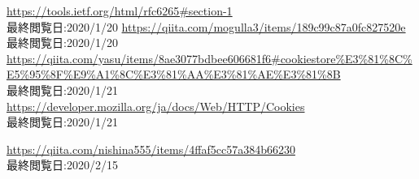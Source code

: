 \begin{thebibliography}{99}
 \url{https://tools.ietf.org/html/rfc6265#section-1} \\ 最終閲覧日:2020/1/20
 \url{https://qiita.com/mogulla3/items/189c99c87a0fc827520e} \\ 最終閲覧日:2020/1/20
 \url{https://qiita.com/yasu/items/8ae3077bdbee606681f6#cookiestore%E3%81%8C%E5%95%8F%E9%A1%8C%E3%81%AA%E3%81%AE%E3%81%8B} \\ 最終閲覧日:2020/1/21
 \url{https://developer.mozilla.org/ja/docs/Web/HTTP/Cookies} \\最終閲覧日:2020/1/21



 \url{https://qiita.com/nishina555/items/4ffaf5cc57a384b66230} \\ 最終閲覧日:2020/2/15

\end{thebibliography}


